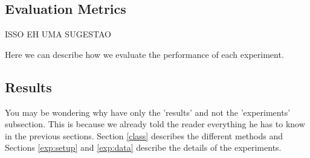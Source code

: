 \documentclass[12pt]{article}
\begin{document}
\subsection{Evaluation Metrics} \label{exp:metric}

ISSO EH UMA SUGESTAO

Here we can describe how we evaluate the performance of each experiment.

\subsection{Results} \label{exp:res}

You may be wondering why have only the 'results' and not the 'experiments' subsection. This is because we already told the reader everything he has to know in the previous sections. Section \ref{class} describes the different methods and Sections \ref{exp:setup} and \ref{exp:data} describe the details of the experiments.


\begin{table}[h]
\centering
\caption{Confusion Matrix for Neural Network}
\label{tab:confusion_nn}
\end{table}
\end{document}
